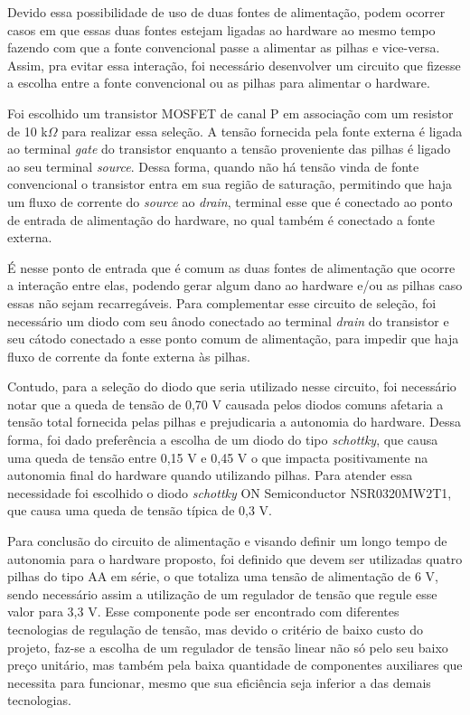 Devido essa possibilidade de uso de duas fontes de alimentação, podem ocorrer casos em que essas duas fontes estejam ligadas ao hardware ao mesmo tempo fazendo com que a fonte convencional passe a alimentar as pilhas e vice-versa. Assim, pra evitar essa interação, foi necessário desenvolver um circuito que fizesse a escolha entre a fonte convencional ou as pilhas para alimentar o hardware. 

Foi escolhido um transistor \gls{MOSFET} de canal P em associação com um resistor de 10 k$\Omega$ para realizar essa seleção. A tensão fornecida pela fonte externa é ligada ao terminal \textit{gate} do transistor enquanto a tensão proveniente das pilhas é ligado ao seu terminal \textit{source}. Dessa forma, quando não há tensão vinda de fonte convencional o transistor entra em sua região de saturação, permitindo que haja um fluxo de corrente do \textit{source} ao \textit{drain}, terminal esse que é conectado ao ponto de entrada de alimentação do hardware, no qual também é conectado a fonte externa. 

É nesse ponto de entrada que é comum as duas fontes de alimentação que ocorre a interação entre elas, podendo gerar algum dano ao hardware e/ou as pilhas caso essas não sejam recarregáveis. Para complementar esse circuito de seleção, foi necessário um diodo com seu ânodo conectado ao terminal \textit{drain} do transistor e seu cátodo conectado a esse ponto comum de alimentação, para impedir que haja fluxo de corrente da fonte externa às pilhas. 

Contudo, para a seleção do diodo que seria utilizado nesse circuito, foi necessário notar que a queda de tensão de 0,70 V causada pelos diodos comuns afetaria a tensão total fornecida pelas pilhas e prejudicaria a autonomia do hardware. Dessa forma, foi dado preferência a escolha de um diodo do tipo \textit{schottky}, que causa uma queda de tensão entre 0,15 V e 0,45 V o que impacta positivamente na autonomia final do hardware quando utilizando pilhas. Para atender essa necessidade foi escolhido o diodo \textit{schottky} ON Semiconductor NSR0320MW2T1, que causa uma queda de tensão típica de 0,3 V.

Para conclusão do circuito de alimentação e visando definir um longo tempo de autonomia para o hardware proposto, foi definido que devem ser utilizadas quatro pilhas do tipo AA em série, o que totaliza uma tensão de alimentação de 6 V, sendo necessário assim a utilização de um regulador de tensão que regule esse valor para 3,3 V. Esse componente pode ser encontrado com diferentes tecnologias de regulação de tensão, mas devido o critério de baixo custo do projeto, faz-se a escolha de um regulador de tensão linear não só pelo seu baixo preço unitário, mas também pela baixa quantidade de componentes auxiliares que necessita para funcionar, mesmo que sua eficiência seja inferior a das demais tecnologias.

